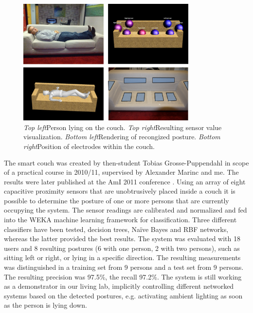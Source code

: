 \begin{figure}[ht]
\centering
\includegraphics[width=0.8\textwidth]{images/other_proto_smartcouch}
\caption{\emph{Top left}Person lying on the couch. \emph{Top right}Resulting sensor value visualization. \emph{Bottom left}Rendering of recongized posture. \emph{Bottom right}Position of electrodes within the couch.}
\label{fig:other_proto_smartcouch}
\end{figure}

The smart couch was created by then-student Tobias Grosse-Puppendahl in scope of a practical course in 2010/11, supervised by Alexander Marinc and me. The results were later published at the AmI 2011 conference \cite{Couch2011}. Using an array of eight capacitive proximity sensors that are unobtrusively placed inside a couch it is possible to determine the posture of one or more persons that are currently occupying the system. The sensor readings are calibrated and normalized and fed into the WEKA machine learning framework for classification. Three different classifiers have been tested, decision trees, Na\"{i}ve Bayes and RBF networks, whereas the latter provided the best results. The system was evaluated with 18 users and 8 resulting postures (6 with one person, 2 with two persons), such as sitting left or right, or lying in a specific direction. The resulting measurements was distinguished in a training set from 9 persons and a test set from 9 persons. The resulting precision was 97.5\%, the recall 97.2\%. The system is still working as a demonstrator in our living lab, implicitly controlling different networked systems based on the detected postures, e.g. activating ambient lighting as soon as the person is lying down.


